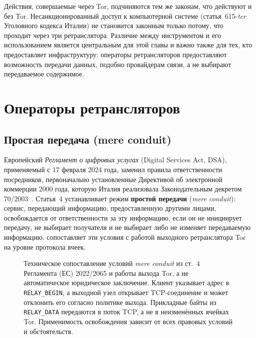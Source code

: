 Действия, совершаемые через Tor, подчиняются тем же законам, что действуют и без Tor. Несанкционированный доступ к компьютерной системе (статья~615-\emph{ter} Уголовного кодекса Италии) не становится законным только потому, что проходит через три ретранслятора. Различие между инструментом и его использованием является центральным для этой главы и важно также для тех, кто предоставляет инфраструктуру: операторы ретрансляторов предоставляют возможность передачи данных, подобно провайдерам связи, а не выбирают передаваемое содержимое.

\section{Операторы ретрансляторов}\label{sec:legale-relay}

\subsection{Простая передача (mere conduit)}

Европейский \emph{Регламент о цифровых услугах} (Digital Services Act, DSA), применяемый с 17 февраля 2024 года, заменил правила ответственности посредников, первоначально установленные Директивой об электронной коммерции 2000 года, которую Италия реализовала Законодательным декретом 70/2003~\cite{dsa2022}. Статья~4 устанавливает режим \textbf{простой передачи} (\emph{mere conduit}): сервис, передающий информацию, предоставленную другими лицами, освобождается от ответственности за эту информацию, если он не инициирует передачу, не выбирает получателя и не выбирает либо не изменяет передаваемую информацию.  сопоставляет эти условия с работой выходного ретранслятора Tor на уровне протокола ячеек.

\begin{figure}[htbp]
\centering

\caption{Техническое сопоставление условий \emph{mere conduit} из ст.~4 Регламента (ЕС) 2022/2065 и работы выхода Tor, а не автоматическое юридическое заключение. Клиент указывает адрес в \texttt{RELAY\_BEGIN}, а выходной узел открывает TCP-соединение и может отклонить его согласно политике выхода. Прикладные байты из \texttt{RELAY\_DATA} передаются в поток TCP, а не в неизменённых ячейках Tor. Применимость освобождения зависит от всех правовых условий и обстоятельств.}
\label{fig:conduit}
\end{figure}

